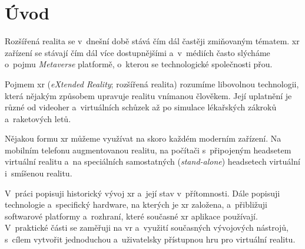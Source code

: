 \chapter*{Úvod}
Rozšířená realita se v~dnešní době stává čím dál častěji zmiňovaným tématem. \gls{xr} zařízení se stávají čím dál více dostupnějšími a~v~médiích často slýcháme o~pojmu \textit{Metaverse} \poml platformě, o~kterou se technologické společnosti přou.

Pojmem \gls{xr} (\textit{eXtended Reality}; rozšířená realita) rozumíme libovolnou technologii, která nějakým způsobem upravuje realitu vnímanou člověkem. Její uplatnění je různé \poml od videoher a~virtuálních schůzek až po simulace lékařských zákroků a~raketových letů. \cite{muni_kybernetika}

Nějakou formu \gls{xr} můžeme využívat na skoro každém moderním zařízení. Na mobilním telefonu augmentovanou realitu, na počítači s~připojeným headsetem virtuální realitu a~na speciálních samostatných (\textit{stand-alone}) headsetech virtuální i~smíšenou realitu.

V~práci popisuji historický vývoj \gls{xr} a~její stav v~přítomnosti. Dále popisuji technologie a~specifický hardware, na kterých je \gls{xr} založena, a~přibližuji softwarové platformy a~rozhraní, které současné \gls{xr} aplikace používají. V~praktické části se zaměřuji na \gls{vr} a~využití současných vývojových nástrojů, s~cílem vytvořit jednoduchou a~uživatelsky přístupnou hru pro virtuální realitu.
